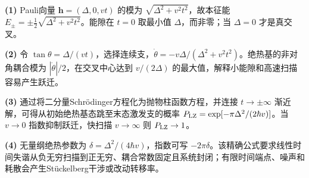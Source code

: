 \par\noindent\textbf{(1)} Pauli向量 \(\boldsymbol h=(\Delta,0,vt)\) 的模为 \(\sqrt{\Delta^2+v^2t^2}\)，故本征能 \(E_\pm=\pm\frac12\sqrt{\Delta^2+v^2t^2}\)。能隙在 \(t=0\) 取最小值 \(\Delta\)，而非零；当 \(\Delta=0\) 才是真交叉。
\par\noindent\textbf{(2)} 令 \(\tan\theta=\Delta/(vt)\)，选择连续支，\(\dot\theta=-v\Delta/(\Delta^2+v^2t^2)\)。绝热基的非对角耦合模为 \(|\dot\theta|/2\)，在交叉中心达到 \(v/(2\Delta)\) 的最大值，解释小能隙和高速扫描容易产生跃迁。
\par\noindent\textbf{(3)} 通过将二分量Schrödinger方程化为抛物柱函数方程，并连接 \(t\to\pm\infty\) 渐近解，可得从初始绝热基态跳至末态激发支的概率 \(P_{\rm LZ}=\exp[-\pi\Delta^2/(2\hbar v)]\)。当 \(v\to0\) 指数抑制跃迁，快扫描 \(v\to\infty\) 则 \(P_{\rm LZ}\to1\)。
\par\noindent\textbf{(4)} 无量纲绝热参数为 \(\delta=\Delta^2/(4\hbar v)\)，指数可写 \(-2\pi\delta\)。该精确公式要求线性时间失谐从负无穷扫描到正无穷、耦合常数固定且系统封闭；有限时间端点、噪声和耗散会产生Stückelberg干涉或改动转移率。
